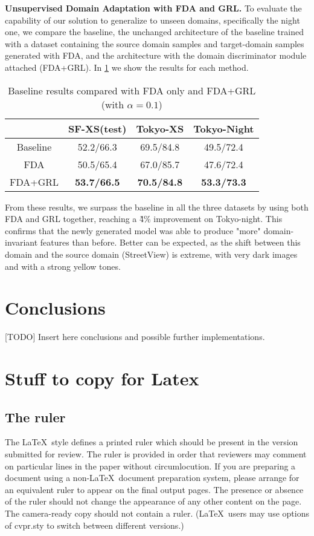 \documentclass[10pt,twocolumn,letterpaper]{article}
\begin{document}
\textbf{Unsupervised Domain Adaptation with FDA and GRL.}
To evaluate the capability of our solution to generalize to unseen domains, specifically the night one, we compare the baseline, the unchanged architecture of the baseline trained with a dataset containing the source domain samples and target-domain samples generated with FDA, and the architecture with the domain discriminator module attached (FDA+GRL). In \cref{tab:fda+grl} we show the results for each method.

\begin{table}[htp]
  \centering
  \begin{tabular}{@{}cccc@{}}
    \toprule
    & SF-XS(test) & Tokyo-XS & Tokyo-Night\\
    \midrule
    Baseline & 52.2/66.3 & 69.5/84.8 & 49.5/72.4 \\
    FDA & 50.5/65.4 & 67.0/85.7 & 47.6/72.4 \\
    FDA+GRL & \textbf{53.7/66.5} & \textbf{70.5/84.8} & \textbf{53.3/73.3}\\
    \bottomrule
  \end{tabular}
  \caption{Baseline results compared with FDA only and FDA+GRL (with $\alpha=0.1$)}
  \label{tab:fda+grl}
\end{table}

From these results, we surpass the baseline in all the three datasets by using both FDA and GRL together, reaching a \~4\% improvement on Tokyo-night. This confirms that the newly generated model was able to produce "more" domain-invariant features than before. Better can be expected, as the shift between this domain and the source domain (StreetView) is extreme, with very dark images and with a strong yellow tones.

\section{Conclusions}
[TODO] Insert here conclusions and possible further implementations.


\section{Stuff to copy for Latex}

\subsection{The ruler}
The \LaTeX\ style defines a printed ruler which should be present in the version submitted for review.
The ruler is provided in order that reviewers may comment on particular lines in the paper without circumlocution.
If you are preparing a document using a non-\LaTeX\ document preparation system, please arrange for an equivalent ruler to appear on the final output pages.
The presence or absence of the ruler should not change the appearance of any other content on the page.
The camera-ready copy should not contain a ruler.
(\LaTeX\ users may use options of cvpr.sty to switch between different versions.)
\end{document}
